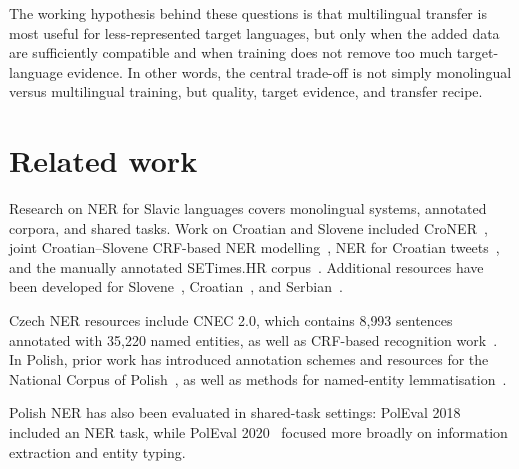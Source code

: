 \documentclass{article}
\begin{document}
The working hypothesis behind these questions is that multilingual transfer is most useful for less-represented target languages, but only when the added data are sufficiently compatible and when training does not remove too much target-language evidence.
In other words, the central trade-off is not simply monolingual versus multilingual training, but quality, target evidence, and transfer recipe.



\section{Related work}
Research on NER for Slavic languages covers monolingual systems, annotated corpora, and shared tasks. 
Work on Croatian and Slovene included CroNER~\parencite{karan-2013-croner}, joint Croatian--Slovene CRF-based NER modelling~\parencite{ljubevsic2013combining}, NER for Croatian tweets~\parencite{baksa2016tagging}, and the manually annotated SETimes.HR corpus~\parencite{agic2014setimes}. 
Additional resources have been developed for Slovene~\parencite{krek2020a-ssj500k}, Croatian~\parencite{hr500k-10}, and Serbian~\parencite{SETimes-SR-1.0}.

Czech NER resources include CNEC 2.0, which contains 8{,}993 sentences annotated with 35{,}220 named entities, as well as CRF-based recognition work~\parencite{CNEC-2.0, konkol2013crf}.
In Polish, prior work has introduced annotation schemes and resources for the National Corpus of Polish~\parencite{waszczuk2010tools, savary2011language}, as well as methods for named-entity lemmatisation~\parencite{piskorski2009knowledge, marcinczuk2017lemmatization}. 

Polish NER has also been evaluated in shared-task settings: PolEval 2018~\parencite{ogrodniczuk-poleval-2018} included an NER task, while PolEval 2020~\parencite{ogrodniczuk-poleval-2020} focused more broadly on information extraction and entity typing.
\end{document}
